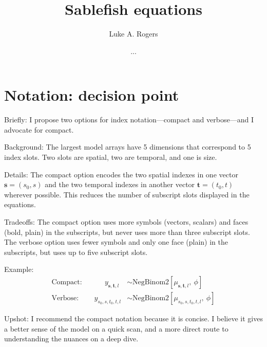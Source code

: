 \documentclass{article}
\title{Sablefish equations }
\author[1]{Luke A. Rogers}
\author[]{...}
\affil[1]{Pacific Biological Station, Fisheries and Oceans Canada, Nanaimo, BC, V9T 6N7, Canada}
\begin{document}
\maketitle
\linenumbers
\setcounter{secnumdepth}{0}

\section{Notation: decision point}

Briefly: I propose two options for index notation---compact and verbose---and I advocate for compact.
\newline

\noindent Background: The largest model arrays have 5 dimensions that correspond to 5 index slots. Two slots are spatial, two are temporal, and one is size.
\newline

\noindent Details: The compact option encodes the two spatial indexes in one vector $\boldsymbol{s} = \left( s_0,s \right)$ and the two temporal indexes in another vector $\boldsymbol{t} = \left( t_0, t \right)$ wherever possible. This reduces the number of subscript slots displayed in the equations.
\newline

\noindent Tradeoffs: The compact option uses more symbols (vectors, scalars) and faces (bold, plain) in the subscripts, but never uses more than three subscript slots. The verbose option uses fewer symbols and only one face (plain) in the subscripts, but uses up to five subscript slots.
\newline

\noindent Example:
\begin{align}
  \mathrm{Compact:}\qquad \quad y_{\boldsymbol{s}, \boldsymbol{t},l} &\sim \mathrm{NegBinom2} \!
                                                                 \left[\mu_{\boldsymbol{s}, \boldsymbol{t},l}
                                                                 \mathrm{,} \: \phi \right] \\
  \mathrm{Verbose:}\qquad y_{s_0,s,t_0,t,l} &\sim \mathrm{NegBinom2} \!
                                              \left[\mu_{s_0,s,t_0,t,l} \mathrm{,} \: \phi \right]
\end{align}

\noindent Upshot: I recommend the compact notation because it is concise. I believe it gives a better sense of the model on a quick scan, and a more direct route to understanding the nuances on a deep dive.
\end{document}
